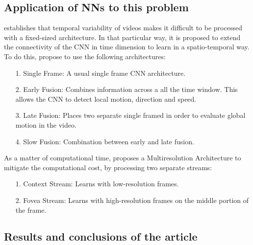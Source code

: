 \documentclass[12pt]{article}
\theoremstyle{plain}
\theoremstyle{definition}
\theoremstyle{definition}
\theoremstyle{definition}
\newtheorem*{solution}{Solución}
\begin{document}
\subsection*{Application of NNs to this problem}
\noindent \cite{6909619} establishes that temporal variability of videos makes it difficult to be processed with a fixed-sized architecture. In that particular way, it is proposed to extend the connectivity of the CNN in
time dimension to learn in a spatio-temporal way. To do this, \cite{6909619} propose to use the following architectures:
\begin{itemize}
    \item[1.] Single Frame: A usual single frame CNN architecture. 
    \item[2.] Early Fusion: Combines information across a all the time window. This allows the CNN to detect local motion, direction and speed.
    \item[3.] Late Fusion: Places two separate single framed in order to evaluate global motion in the video. \item[4.] Slow Fusion: Combination between early and late fusion. 
\end{itemize}
As a matter of computational time, \cite{6909619} proposes a Multiresolution Architecture to mitigate the computational cost, by processing two separate streams:
\begin{itemize}
    \item[1.] Context Stream: Learns with low-resolution frames.
    \item[2.] Fovea Stream: Learns with high-resolution frames  on the middle portion of the frame.
\end{itemize}

\subsection*{Results and conclusions of the article}
\noindent


\newpage


\end{document}
